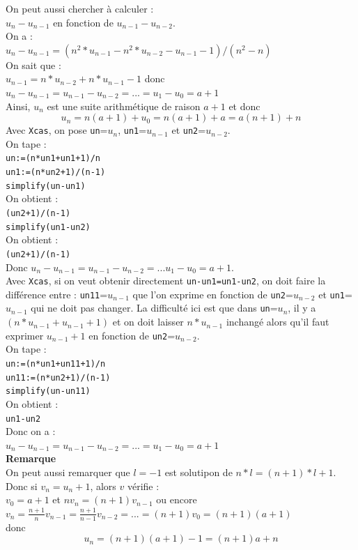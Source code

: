 \documentclass[a4paper,11pt]{book}
\begin{document}
On peut aussi chercher \`a calculer :\\
$u_n-u_{n-1}$ en fonction de $u_{n-1}-u_{n-2}$.\\
On a :\\
$u_n-u_{n-1}=(n^2*u_{n-1}-n^2*u_{n-2}-u_{n-1}-1)/(n^2-n)$ \\
On sait que :\\
$u_{n-1}=n*u_{n-2}+n*u_{n-1}-1$ donc \\
$u_n-u_{n-1}=u_{n-1}-u_{n-2}=...=u_1-u_0=a+1$\\
Ainsi, $u_n$ est une suite arithm\'etique de raison $a+1$ et donc
$$u_n=n(a+1)+u_0=n(a+1)+a=a(n+1)+n$$
Avec {\tt Xcas}, on pose {\tt un}=$u_n$, {\tt un1}=$u_{n-1}$ et 
{\tt un2}=$u_{n-2}$.\\
On tape :\\
{\tt un:=(n*un1+un1+1)/n}\\
{\tt un1:=(n*un2+1)/(n-1)}\\
{\tt simplify(un-un1)}\\
On obtient :\\
{\tt (un2+1)/(n-1)}\\
{\tt simplify(un1-un2)}\\
On obtient :\\
{\tt (un2+1)/(n-1)}\\
Donc $u_n-u_{n-1}=u_{n-1}-u_{n-2}=...u_1-u_0=a+1$.\\
Avec {\tt Xcas}, si on veut obtenir directement {\tt un-un1=un1-un2},
on doit faire la diff\'erence entre :
{\tt un11}=$u_{n-1}$ que l'on exprime en fonction de {\tt un2}=$u_{n-2}$ et
{\tt un1}=$u_{n-1}$ qui ne doit pas changer. La difficult\'e ici est que dans
{\tt un}=$u_n$, il y a $(n*u_{n-1}+u_{n-1}+1)$ et on doit laisser $n*u_{n-1}$ 
inchang\'e alors qu'il faut  exprimer $u_{n-1}+1$ en fonction de 
{\tt un2}=$u_{n-2}$.\\
On tape :\\
{\tt un:=(n*un1+un11+1)/n}\\
{\tt un11:=(n*un2+1)/(n-1)}\\
{\tt simplify(un-un11)}\\
On obtient :\\
{\tt un1-un2}\\
Donc on a :\\
 $u_n-u_{n-1}=u_{n-1}-u_{n-2}=...=u_1-u_0=a+1$\\
{\bf Remarque}\\
On peut aussi remarquer que $l=-1$ est solutipon de $n*l=(n+1)*l+1$.\\
Donc si $v_n=u_n+1$, alors $v$ v\'erifie :\\
$v_0=a+1$ et $nv_n=(n+1)v_{n-1}$ ou encore \\
$v_n=\frac{n+1}{n}v_{n-1}=\frac{n+1}{n-1}v_{n-2}=...=(n+1)v_0=(n+1)(a+1)$\\
donc 
$$u_n=(n+1)(a+1)-1=(n+1)a+n$$
\end{document}
